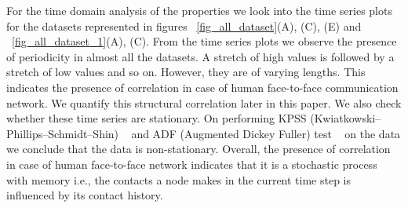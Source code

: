 For the time domain analysis of the properties we look into the time series plots for the datasets represented in figures ~\ref{fig_all_dataset}(A), (C), (E) and 
~\ref{fig_all_dataset_1}(A), (C).
From the time series plots we observe the presence of periodicity in almost all the datasets. A stretch of high values is followed by a stretch of low values 
and so on. However, they are of varying lengths.  
This indicates the presence of correlation in case of human face-to-face communication network.
We quantify this structural correlation later in this paper. 
We also check whether these time series are stationary. 
On performing KPSS (Kwiatkowski–Phillips–Schmidt–Shin) ~\cite{kwiatkowski1992testing} and 
 ADF (Augmented Dickey Fuller) test ~\cite{dickey1979distribution} on the data we conclude that the data is non-stationary. 
 Overall, the presence of correlation in case of human face-to-face network indicates that it is a stochastic process with memory i.e., the contacts a node 
 makes in the current time step is influenced by its contact history. 
